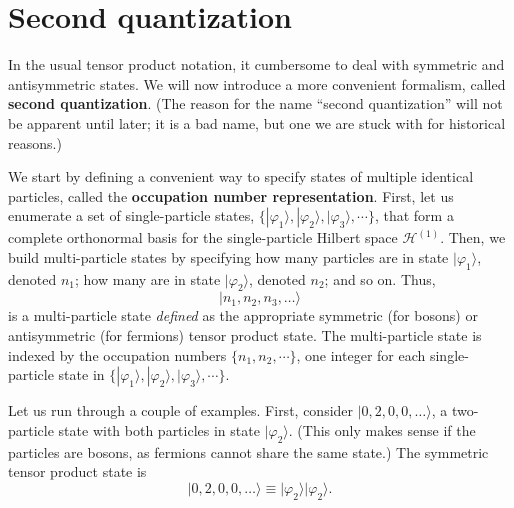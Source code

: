 \documentclass[pra,12pt]{revtex4}
\begin{document}
\section{Second quantization}

In the usual tensor product notation, it cumbersome to deal with
symmetric and antisymmetric states.  We will now introduce a more
convenient formalism, called \textbf{second quantization}.  (The
reason for the name ``second quantization'' will not be apparent until
later; it is a bad name, but one we are stuck with for historical
reasons.)

We start by defining a convenient way to specify states of multiple
identical particles, called the \textbf{occupation number
  representation}.  First, let us enumerate a set of single-particle
states, $\{|\varphi_1\rangle, |\varphi_2\rangle, |\varphi_3\rangle,
\cdots\}$, that form a complete orthonormal basis for the
single-particle Hilbert space $\mathscr{H}^{(1)}$.  Then, we build
multi-particle states by specifying how many particles are in state
$|\varphi_1\rangle$, denoted $n_1$; how many are in state
$|\varphi_2\rangle$, denoted $n_2$; and so on.  Thus,
$$|n_1,n_2,n_3,\dots\rangle$$
is a multi-particle state \textit{defined} as the appropriate
symmetric (for bosons) or antisymmetric (for fermions) tensor product
state.  The multi-particle state is indexed by the occupation numbers
$\{n_1,n_2,\cdots\}$, one integer for each single-particle state in
$\{|\varphi_1\rangle, |\varphi_2\rangle, |\varphi_3\rangle, \cdots\}$.

Let us run through a couple of examples.  First, consider
$|0,2,0,0,\dots\rangle$, a two-particle state with both particles in
state $|\varphi_2\rangle$.  (This only makes sense if the particles
are bosons, as fermions cannot share the same state.)  The symmetric
tensor product state is
$$|0,2,0,0,\dots\rangle \equiv |\varphi_2\rangle|\varphi_2\rangle.$$
\end{document}
